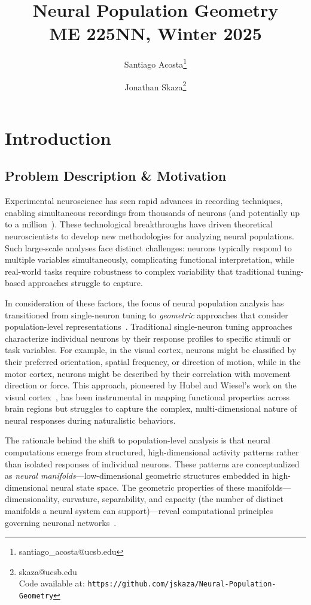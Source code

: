 \documentclass[11pt,a4paper]{article}
\author[1]{Santiago Acosta\thanks{santiago\_acosta@ucsb.edu}}
\author[1]{Jonathan Skaza\thanks{skaza@ucsb.edu\\Code available at: \texttt{https://github.com/jskaza/Neural-Population-Geometry}}}
\affil[1]{Dynamical Neuroscience Graduate Program, University of California, Santa Barbara}
\title {Neural Population Geometry \\[1ex] \large ME 225NN, Winter 2025}
\date{}
\begin{document}
\maketitle
\section{Introduction}

\subsection{Problem Description \& Motivation}
Experimental neuroscience has seen rapid advances in recording techniques, enabling simultaneous recordings from thousands of neurons (and potentially up to a million~\cite{demas2021high}). These technological breakthroughs have driven theoretical neuroscientists to develop new methodologies for analyzing neural populations. Such large-scale analyses face distinct challenges: neurons typically respond to multiple variables simultaneously, complicating functional interpretation, while real-world tasks require robustness to complex variability that traditional tuning-based approaches struggle to capture.

In consideration of these factors, the focus of neural population analysis has transitioned from single-neuron tuning to \textit{geometric} approaches that consider population-level representations~\cite{yuste2015neuron, saxena2019towards}. Traditional single-neuron tuning approaches characterize individual neurons by their response profiles to specific stimuli or task variables. For example, in the visual cortex, neurons might be classified by their preferred orientation, spatial frequency, or direction of motion, while in the motor cortex, neurons might be described by their correlation with movement direction or force. This approach, pioneered by Hubel and Wiesel's work on the visual cortex~\cite{hubel1959receptive}, has been instrumental in mapping functional properties across brain regions but struggles to capture the complex, multi-dimensional nature of neural responses during naturalistic behaviors.

The rationale behind the shift to population-level analysis is that neural computations emerge from structured, high-dimensional activity patterns rather than isolated responses of individual neurons. These patterns are conceptualized as \textit{neural manifolds}---low-dimensional geometric structures embedded in high-dimensional neural state space. The geometric properties of these manifolds---dimensionality, curvature, separability, and capacity (the number of distinct manifolds a neural system can support)---reveal computational principles governing neuronal networks~\cite{chung2021neural}. 
\end{document}
